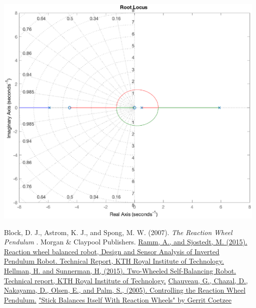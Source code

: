 \documentclass[12pt,letterpaper]{article}
\begin{document}
\includegraphics[width=\textwidth]{images/rootLocusFull.eps} 
    \label{rootLocusFull}









 
\begin{thebibliography}{99}
 Block, D. J., Astrom, K. J., and Spong, M. W. (2007).  \emph{The Reaction Wheel Pendulum} . Morgan \& Claypool Publishers.
 \href{http://www.diva-portal.se/smash/get/diva2:916271/FULLTEXT01.pdf}{Ramm, A., and Sjostedt, M. (2015). Reaction wheel balanced robot, Design and Sensor Analysis of Inverted Pendulum Robot. Technical Report, KTH Royal Institute of Technology.}
 \href{https://kth.diva-portal.org/smash/get/diva2:916184/FULLTEXT01.pdf}{Hellman, H. and Sunnerman, H, (2015).  Two-Wheeled Self-Balancing Robot. Technical report, KTH Royal Institute of Technology.}
 \href{http://geoffrey.chauveau.free.fr/pendulum/reports/final_report.pdf}{Chauveau, G., Chazal, D., Nakayama, D., Olsen, E., and Palm, S., (2005).  Controlling the Reaction Wheel Pendulum.}
 \href{https://hackaday.com/2016/08/11/stick-balances-itself-with-reaction-wheels/}{"Stick Balances Itself With Reaction Wheels" by Gerrit Coetzee}
\end{thebibliography}
\end{document}
